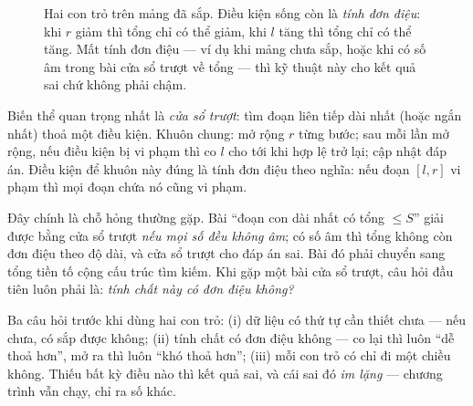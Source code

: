 \documentclass[../../algorithm.tex]{subfiles}
\begin{document}
\begin{figure}[H]\centering
{}
\caption{Hai con trỏ trên mảng đã sắp. Điều kiện sống còn là \emph{tính đơn điệu}: khi \(r\) giảm thì tổng chỉ có thể giảm, khi \(l\) tăng thì tổng chỉ có thể tăng. Mất tính đơn điệu --- ví dụ khi mảng chưa sắp, hoặc khi có số âm trong bài cửa sổ trượt về tổng --- thì kỹ thuật này cho kết quả sai chứ không phải chậm.}
\label{fig:twoptr}
\end{figure}

Biến thể quan trọng nhất là \emph{cửa sổ trượt}: tìm đoạn liên tiếp dài nhất (hoặc ngắn nhất) thoả một điều kiện. Khuôn chung: mở rộng \(r\) từng bước; sau mỗi lần mở rộng, nếu điều kiện bị vi phạm thì co \(l\) cho tới khi hợp lệ trở lại; cập nhật đáp án. Điều kiện để khuôn này đúng là tính đơn điệu theo nghĩa: nếu đoạn \([l,r]\) vi phạm thì mọi đoạn chứa nó cũng vi phạm.

Đây chính là chỗ hỏng thường gặp. Bài ``đoạn con dài nhất có tổng \(\le S\)'' giải được bằng cửa sổ trượt \emph{nếu mọi số đều không âm}; có số âm thì tổng không còn đơn điệu theo độ dài, và cửa sổ trượt cho đáp án sai. Bài đó phải chuyển sang tổng tiền tố cộng cấu trúc tìm kiếm. Khi gặp một bài cửa sổ trượt, câu hỏi đầu tiên luôn phải là: \emph{tính chất này có đơn điệu không?}

\begin{cannho}
Ba câu hỏi trước khi dùng hai con trỏ: (i) dữ liệu có thứ tự cần thiết chưa --- nếu chưa, có sắp được không; (ii) tính chất có đơn điệu không --- co lại thì luôn ``dễ thoả hơn'', mở ra thì luôn ``khó thoả hơn''; (iii) mỗi con trỏ có chỉ đi một chiều không. Thiếu bất kỳ điều nào thì kết quả sai, và cái sai đó \emph{im lặng} --- chương trình vẫn chạy, chỉ ra số khác.
\end{cannho}
\end{document}
